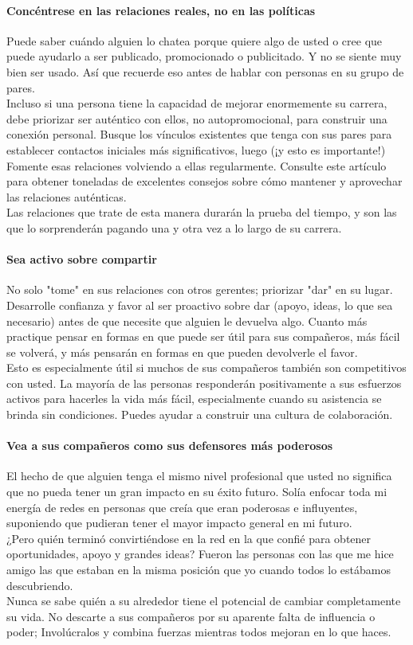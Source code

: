 \documentclass[10pt]{book}
\begin{document}
\paragraph{Concéntrese en las relaciones reales, no en las políticas}
Puede saber cuándo alguien lo chatea porque quiere algo de usted o cree que puede ayudarlo a ser publicado, promocionado o publicitado. Y no se siente muy bien ser usado. Así que recuerde eso antes de hablar con personas en su grupo de pares.\\
Incluso si una persona tiene la capacidad de mejorar enormemente su carrera, debe priorizar ser auténtico con ellos, no autopromocional, para construir una conexión personal. Busque los vínculos existentes que tenga con sus pares para establecer contactos iniciales más significativos, luego (¡y esto es importante!) Fomente esas relaciones volviendo a ellas regularmente. Consulte este artículo para obtener toneladas de excelentes consejos sobre cómo mantener y aprovechar las relaciones auténticas.\\
Las relaciones que trate de esta manera durarán la prueba del tiempo, y son las que lo sorprenderán pagando una y otra vez a lo largo de su carrera.
\paragraph{Sea activo sobre compartir}
No solo "tome" en sus relaciones con otros gerentes; priorizar "dar" en su lugar. Desarrolle confianza y favor al ser proactivo sobre dar (apoyo, ideas, lo que sea necesario) antes de que necesite que alguien le devuelva algo. Cuanto más practique pensar en formas en que puede ser útil para sus compañeros, más fácil se volverá, y más pensarán en formas en que pueden devolverle el favor.\\
Esto es especialmente útil si muchos de sus compañeros también son competitivos con usted. La mayoría de las personas responderán positivamente a sus esfuerzos activos para hacerles la vida más fácil, especialmente cuando su asistencia se brinda sin condiciones. Puedes ayudar a construir una cultura de colaboración.
\paragraph{Vea a sus compañeros como sus defensores más poderosos}
El hecho de que alguien tenga el mismo nivel profesional que usted no significa que no pueda tener un gran impacto en su éxito futuro. Solía enfocar toda mi energía de redes en personas que creía que eran poderosas e influyentes, suponiendo que pudieran tener el mayor impacto general en mi futuro.\\
¿Pero quién terminó convirtiéndose en la red en la que confié para obtener oportunidades, apoyo y grandes ideas? Fueron las personas con las que me hice amigo las que estaban en la misma posición que yo cuando todos lo estábamos descubriendo.\\
Nunca se sabe quién a su alrededor tiene el potencial de cambiar completamente su vida. No descarte a sus compañeros por su aparente falta de influencia o poder; Involúcralos y combina fuerzas mientras todos mejoran en lo que haces.
\end{document}
